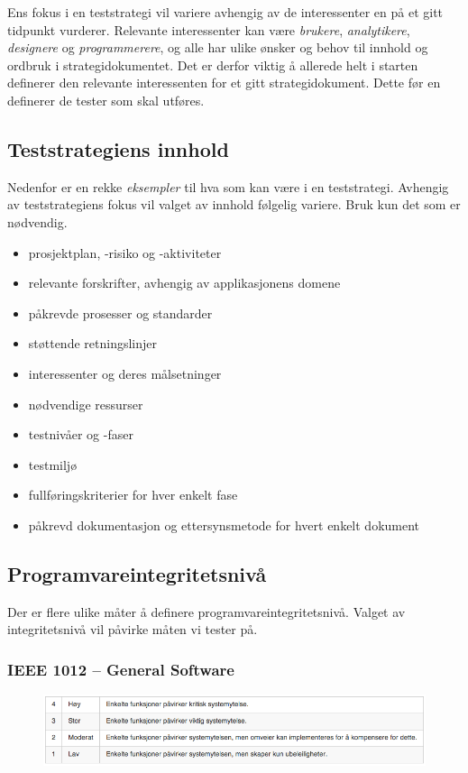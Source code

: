 Ens fokus i en teststrategi vil variere avhengig av de interessenter en
på et gitt tidpunkt vurderer. Relevante interessenter kan være
\emph{brukere}, \emph{analytikere}, \emph{designere} og
\emph{programmerere}, og alle har ulike ønsker og behov til innhold og
ordbruk i strategidokumentet. Det er derfor viktig å allerede helt i
starten definerer den relevante interessenten for et gitt
strategidokument. Dette før en definerer de tester som skal utføres.

\subsection{Teststrategiens innhold}

Nedenfor er en rekke \emph{eksempler} til hva som kan være i en
teststrategi. Avhengig av teststrategiens fokus vil valget av innhold
følgelig variere. Bruk kun det som er nødvendig.

\begin{itemize}
\item
  prosjektplan, -risiko og -aktiviteter
\item
  relevante forskrifter, avhengig av applikasjonens domene
\item
  påkrevde prosesser og standarder
\item
  støttende retningslinjer
\item
  interessenter og deres målsetninger
\item
  nødvendige ressurser
\item
  testnivåer og -faser
\item
  testmiljø
\item
  fullføringskriterier for hver enkelt fase
\item
  påkrevd dokumentasjon og ettersynsmetode for hvert enkelt dokument
\end{itemize}
\subsection{Programvareintegritetsnivå}

Der er flere ulike måter å definere programvareintegritetsnivå. Valget
av integritetsnivå vil påvirke måten vi tester på.

\subsubsection{IEEE 1012 -- General Software}

\begin{figure}[htbp]
\centering
\includegraphics{Forelesning 06/img/tabell1.png}
\caption{}
\end{figure}

